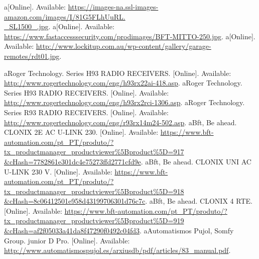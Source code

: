 \begin{thebibliography}{1}
	\bibitem a[Online]. Available: \href{https://images-na.ssl-images-amazon.com/images/I/81G5FLhUuRL._SL1500_.jpg}{https://images-na.ssl-images-amazon.com/images/I/81G5FLhUuRL.\\\_SL1500\_.jpg}.
	\label{motorlineremotelink}
	\bibitem a[Online]. Available: \href{https://www.fastaccesssecurity.com/prodimages/BFT-MITTO-250.jpg}{https://www.fastaccesssecurity.com/prodimages/BFT-MITTO-250.jpg}.
	\label{bftremotelink}
	\bibitem a[Online]. Available: \href{http://www.lockitup.com.au/wp-content/gallery/garage-remotes/rdt01.jpg}{http://www.lockitup.com.au/wp-content/gallery/garage-remotes/rdt01.jpg}.
	\label{ditecremotelink}
	
	\bibitem aRoger Technology. Series H93  RADIO RECEIVERS. [Online]. Available: \href{http://www.rogertechnology.com/eng/h93rx22ai-418.asp}{http://www.rogertechnology.com/eng/h93rx22ai-418.asp}.
	\bibitem aRoger Technology. Series H93 RADIO RECEIVERS. [Online]. Available: \href{http://www.rogertechnology.com/eng/h93rx2rci-1306.asp}{http://www.rogertechnology.com/eng/h93rx2rci-1306.asp}.
	\bibitem aRoger Technology. Series R93 RADIO RECEIVERS. [Online]. Available: \href{http://www.rogertechnology.com/eng/r93rx14m24-502.asp}{http://www.rogertechnology.com/eng/r93rx14m24-502.asp}.
	\bibitem aBft, Be ahead. CLONIX 2E AC U-LINK 230. [Online]. Available: \href{https://www.bft-automation.com/pt_PT/produto/?tx_productmanager_productviewer\%5Bproduct\%5D=917\&cHash=7782861e301dc4e75273ffd2771cfd9e}{https://www.bft-automation.com/pt\_PT/produto/?tx\_productmanager\_productviewer\%5Bproduct\%5D=917\\\&cHash=7782861e301dc4e75273ffd2771cfd9e}.
	\bibitem aBft, Be ahead. CLONIX UNI AC U-LINK 230 V. [Online]. Available: \href{https://www.bft-automation.com/pt_PT/produto/?tx_productmanager_productviewer\%5Bproduct\%5D=918\&cHash=8c06412501e958d43199706301d76c7c}{https://www.bft-automation.com/pt\_PT/produto/?tx\_productmanager\_productviewer\%5Bproduct\%5D=918\\\&cHash=8c06412501e958d43199706301d76c7c}.
	\bibitem aBft, Be ahead. CLONIX 4 RTE. [Online]. Available: \href{https://www.bft-automation.com/pt_PT/produto/?tx_productmanager_productviewer\%5Bproduct\%5D=919\&\\cHash=af2f05033a41da8f47290f0492c04fd3}{https://www.bft-automation.com/pt\_PT/produto/?tx\_productmanager\_productviewer\%5Bproduct\%5D=919\\\&cHash=af2f05033a41da8f47290f0492c04fd3}.
	\bibitem aAutomatismos Pujol, Somfy Group. junior D Pro. [Online]. Available: \href{http://www.automatismospujol.es/arxiusdb/pdf/articles/83_manual.pdf}{http://www.automatismospujol.es/arxiusdb/pdf/articles/83\_manual.pdf}.

\end{thebibliography}
